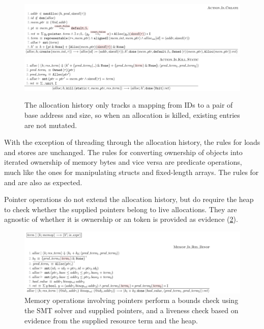\begin{figure}
    \includegraphics{figures/mem-model-dyn-create}
    \includegraphics{figures/mem-model-dyn-kill}
    \caption{The allocation history only tracks a mapping from IDs to a pair of
        base address and size, so when an allocation is killed, existing entries
        are not mutated.}\label{fig:mem-model-dyn-create-kill}
\end{figure}

With the exception of threading through the allocation history, the rules for
loads and stores are unchanged. The rules for converting ownership of objects
into iterated ownership of memory bytes and vice versa are predicate
operations, much like the ones for manipulating structs and fixed-length
arrays. The rules for  and
 are also as expected.

Pointer operations do not extend the allocation history, but do require the
heap to check whether the supplied pointers belong to live allocations. They
are agnostic of whether it is ownership or an  token is
provided as evidence (\cref{fig:mem-model-dyn-ptr-relop}).

\begin{figure}
    \includegraphics{figures/mem-model-dyn-ptr-relop}
    \caption{Memory operations involving pointers perform a bounds check using
        the SMT solver and supplied pointers, and a liveness check based on
        evidence from the supplied resource term and the heap.}\label{fig:mem-model-dyn-ptr-relop}
\end{figure}

